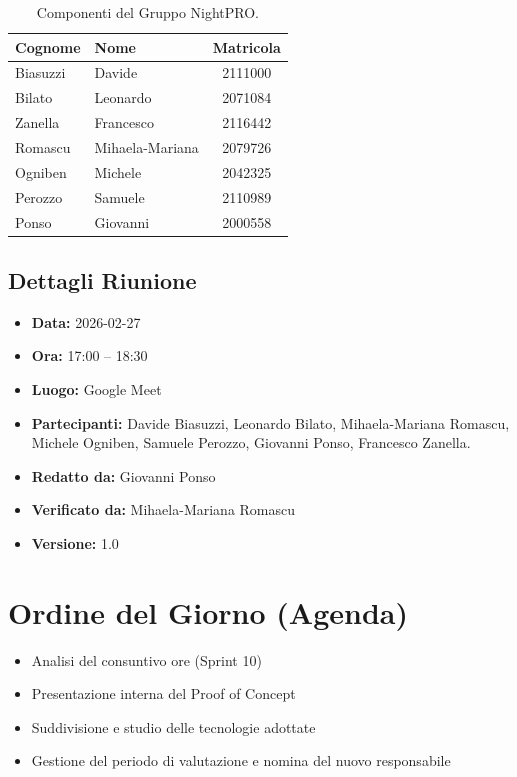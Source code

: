 \documentclass[a4paper, 11pt, oneside]{scrartcl}
\begin{document}
\begin{table}[h!]
\centering
\begin{tabular}{@{}llc@{}}
\toprule
\textbf{Cognome} & \textbf{Nome} & \textbf{Matricola} \\
\midrule
Biasuzzi & Davide & 2111000 \\
Bilato & Leonardo & 2071084 \\
Zanella & Francesco & 2116442 \\
Romascu & Mihaela-Mariana & 2079726 \\
Ogniben & Michele & 2042325 \\
Perozzo & Samuele & 2110989 \\
Ponso & Giovanni & 2000558 \\
\bottomrule
\end{tabular}
\caption{Componenti del Gruppo NightPRO.}
\end{table}


\subsection{Dettagli Riunione}

\begin{itemize}
\item \textbf{Data:} 2026-02-27
\item \textbf{Ora:} 17:00 -- 18:30
\item \textbf{Luogo:} Google Meet
\item \textbf{Partecipanti:} Davide Biasuzzi, Leonardo Bilato, Mihaela-Mariana Romascu, Michele Ogniben, Samuele Perozzo, Giovanni Ponso, Francesco Zanella.
\item \textbf{Redatto da:} Giovanni Ponso
\item \textbf{Verificato da:} Mihaela-Mariana Romascu
\item \textbf{Versione:} 1.0
\end{itemize}


\newpage
\section{Ordine del Giorno (Agenda)}

\begin{itemize}
\item[1.] Analisi del consuntivo ore (Sprint 10)
\item[2.] Presentazione interna del Proof of Concept
\item[3.] Suddivisione e studio delle tecnologie adottate
\item[4.] Gestione del periodo di valutazione e nomina del nuovo responsabile
\end{itemize}
\end{document}
